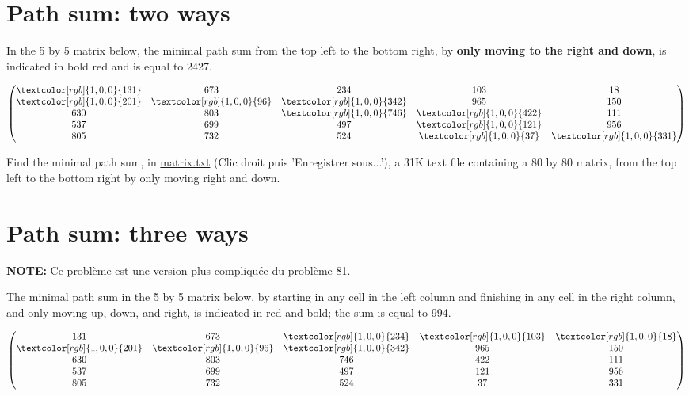 \section{Path sum: two ways} \label{pb.081}

In the 5 by 5 matrix below, the minimal path sum from the top left to the bottom right, by \textbf{only moving to the right and down}, is indicated in bold red and is equal to 2427.

$$\begin{pmatrix}
    \textcolor[rgb]{1,0,0}{131} & 673 & 234 & 103 & 18 \\
    \textcolor[rgb]{1,0,0}{201} & \textcolor[rgb]{1,0,0}{96} & \textcolor[rgb]{1,0,0}{342} & 965 & 150 \\
    630 & 803 & \textcolor[rgb]{1,0,0}{746} & \textcolor[rgb]{1,0,0}{422} & 111\\
    537 & 699 & 497 & \textcolor[rgb]{1,0,0}{121} & 956\\
    805 & 732 & 524 & \textcolor[rgb]{1,0,0}{37} & \textcolor[rgb]{1,0,0}{331}\\
\end{pmatrix}$$


Find the minimal path sum, in \href{https://projecteuler.net/project/resources/p081_matrix.txt}{matrix.txt} (Clic droit puis 'Enregistrer sous...'), a 31K text file containing a 80 by 80 matrix, from the top left to the bottom right by only moving right and down.

\section{Path sum: three ways} \label{pb.082}

\textbf{NOTE:} Ce problème est une version plus compliquée du  \hyperref[pb.081]{problème 81}.

The minimal path sum in the 5 by 5 matrix below, by starting in any cell in the left column and finishing in any cell in the right column, and only moving up, down, and right, is indicated in red and bold; the sum is equal to 994.

$$\begin{pmatrix}
    131 & 673 & \textcolor[rgb]{1,0,0}{234} & \textcolor[rgb]{1,0,0}{103} & \textcolor[rgb]{1,0,0}{18} \\
    \textcolor[rgb]{1,0,0}{201} & \textcolor[rgb]{1,0,0}{96} & \textcolor[rgb]{1,0,0}{342} & 965 & 150 \\
    630 & 803 & 746 & 422 & 111\\
    537 & 699 & 497 & 121 & 956\\
    805 & 732 & 524 & 37 & 331\\
\end{pmatrix}$$

